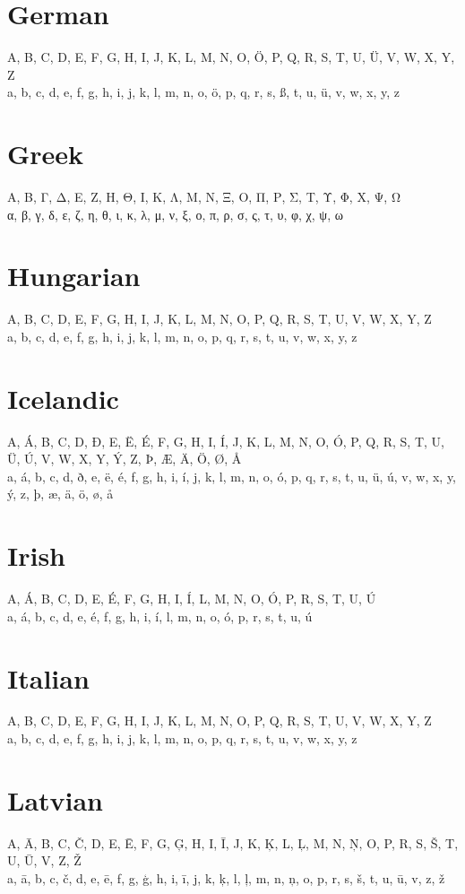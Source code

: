 \documentclass{article}
\begin{document}
\section{German}
A, B, C, D, E, F, G, H, I, J, K, L, M, N, O, Ö, P, Q, R, S, T, U, Ü, V, W, X, Y, Z \\
a, b, c, d, e, f, g, h, i, j, k, l, m, n, o, ö, p, q, r, s, ß, t, u, ü, v, w, x, y, z

\section{Greek}
Α, Β, Γ, Δ, Ε, Ζ, Η, Θ, Ι, Κ, Λ, Μ, Ν, Ξ, Ο, Π, Ρ, Σ, Τ, Υ, Φ,  Χ, Ψ, Ω \\
α, β, γ, δ, ε, ζ, η, θ, ι, κ, λ, μ, ν, ξ, ο, π, ρ, σ, ς, τ, υ, φ, χ, ψ, ω

\section{Hungarian}
A, B, C, D, E, F, G, H, I, J, K, L, M, N, O, P, Q, R, S, T, U, V, W, X, Y, Z \\
a, b, c, d, e, f, g, h, i, j, k, l, m, n, o, p, q, r, s, t, u, v, w, x, y, z

\section{Icelandic}
A, Á, B, C, D, Ð, E, Ë, É, F, G, H, I, Í, J, K, L, M, N, O, Ó, P, Q, R, S, T, U, Ü, Ú, V, W, X, Y, Ý, Z, Þ, Æ, Ä, Ö, Ø, Å \\
a, á, b, c, d, ð, e, ë, é, f, g, h, i, í, j, k, l, m, n, o, ó, p, q, r, s, t, u, ü, ú, v, w, x, y, ý, z, þ, æ, ä, ö, ø, å

\section{Irish}
A, Á, B, C, D, E, É, F, G, H, I, Í, L, M, N, O, Ó, P, R, S, T, U, Ú \\
a, á, b, c, d, e, é, f, g, h, i, í, l, m, n, o, ó, p, r, s, t, u, ú

\section{Italian}
A, B, C, D, E, F, G, H, I, J, K, L, M, N, O, P, Q, R, S, T, U, V, W, X, Y, Z \\
a, b, c, d, e, f, g, h, i, j, k, l, m, n, o, p, q, r, s, t, u, v, w, x, y, z

\section{Latvian}
A, Ā, B, C, Č, D, E, Ē, F, G, Ģ, H, I, Ī, J, K, Ķ, L, Ļ, M, N, Ņ, O, P, R, S, Š, T, U, Ū, V, Z, Ž \\
a, ā, b, c, č, d, e, ē, f, g, ģ, h, i, ī, j, k, ķ, l, ļ, m, n, ņ, o, p, r, s, š, t, u, ū, v, z, ž
\end{document}
